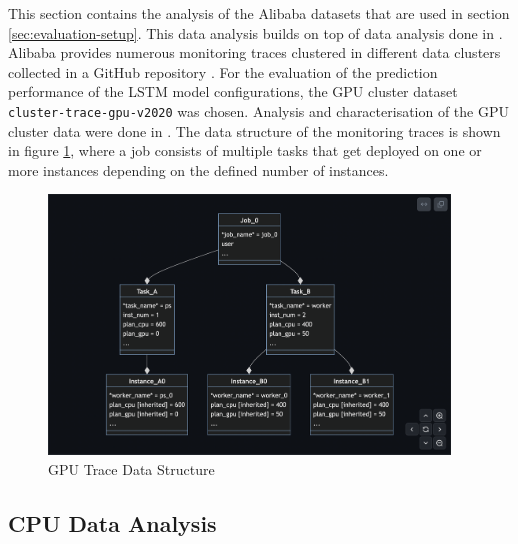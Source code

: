   This section contains the analysis of the Alibaba datasets that are used in section \ref{sec:evaluation-setup}. This data analysis builds on top of data analysis done in \cite{fengcunDeepJSJobScheduling2023}.
  Alibaba provides numerous monitoring traces clustered in different data clusters collected in a GitHub repository \cite{wengAlibabaClusterTrace2023}.
  For the evaluation of the prediction performance of the LSTM model configurations, the GPU cluster dataset \texttt{cluster-trace-gpu-v2020} was chosen. Analysis and characterisation of the GPU cluster data were done in \cite{wengMLaaSWildWorkload2022}.
  The data structure of the monitoring traces is shown in figure \ref{fig:gpu-trace-data-structure}, where a job consists of multiple tasks that get deployed on one or more instances depending on the defined number of instances.

  \begin{figure}
    \centering
    \includegraphics[width=0.95\textwidth]{figures/gpu_dataset_structure.png}
    \caption{GPU Trace Data Structure \cite{wengClusterdataClustertracegpuv2020Master}}
    \label{fig:gpu-trace-data-structure}
  \end{figure}
  

  \subsection{CPU Data Analysis}
  \label{sec:cpu-data-analysis}

